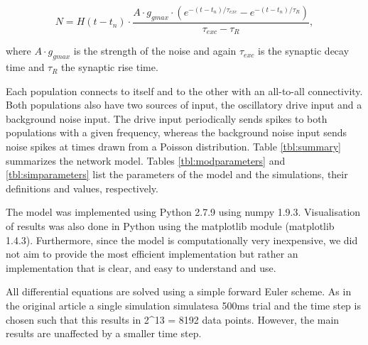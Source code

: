 \documentclass[10pt,a4paper,onecolumn]{article}
\begin{document}
\[N=H(t-t_n) \cdot \frac{A \cdot g _{gmax} \cdot (e^{-(t-t _n)/ \tau _{exc}} - e^{-(t-t _n)/ \tau _R} )}{\tau _{exc} - \tau _R},\]

where \(A \cdot g_{gmax}\) is the strength of the noise and again
\(\tau _{exc}\) is the synaptic decay time and \(\tau_R\) the synaptic
rise time.

Each population connects to itself and to the other with an all-to-all
connectivity. Both populations also have two sources of input, the
oscillatory drive input and a background noise input. The drive input
periodically sends spikes to both populations with a given frequency,
whereas the background noise input sends noise spikes at times drawn
from a Poisson distribution. Table \ref{tbl:summary} summarizes the
network model. Tables \ref{tbl:modparameters} and
\ref{tbl:simparameters} list the parameters of the model and the
simulations, their definitions and values, respectively.

The model was implemented using Python 2.7.9 using numpy 1.9.3.
Visualisation of results was also done in Python using the matplotlib
module (matplotlib 1.4.3). Furthermore, since the model is
computationally very inexpensive, we did not aim to provide the most
efficient implementation but rather an implementation that is clear, and
easy to understand and use.

All differential equations are solved using a simple forward Euler
scheme. As in the original article a single simulation simulatesa 500ms
trial and the time step is chosen such that this results in 2\^{}13 =
8192 data points. However, the main results are unaffected by a smaller
time step.
\end{document}
